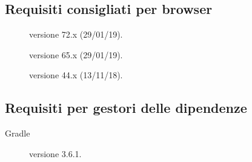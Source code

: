 \documentclass[../../../manuale-manutentore.tex]{subfiles}
\begin{document}
\subsection{Requisiti consigliati per browser}%
\label{sub:requisiti_consigliati per browser}

\begin{description}
  \item[] versione 72.x (29/01/19).
  \item[] versione 65.x (29/01/19).
  \item[] versione 44.x (13/11/18).
\end{description}

\subsection{Requisiti per gestori delle dipendenze}%
\label{sub:requisiti_per_gestori_delle_dipendenze}

\begin{description}
  \item[Gradle] versione 3.6.1.
\end{description}
\end{document}

